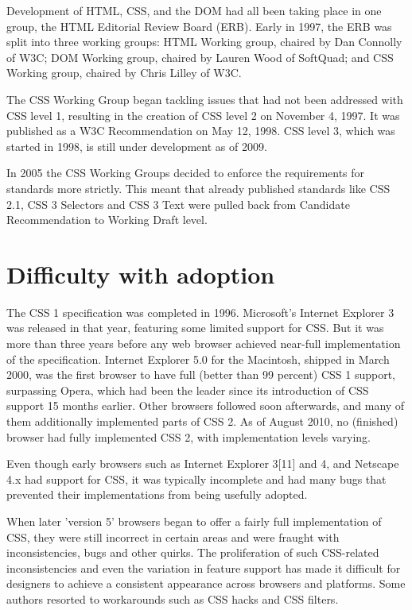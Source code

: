 Development of HTML, CSS, and the DOM had all been taking place in one group, the HTML Editorial Review Board (ERB). Early in 1997, the ERB was split into three working groups: HTML Working group, chaired by Dan Connolly of W3C; DOM Working group, chaired by Lauren Wood of SoftQuad; and CSS Working group, chaired by Chris Lilley of W3C.

The CSS Working Group began tackling issues that had not been addressed with CSS level 1, resulting in the creation of CSS level 2 on November 4, 1997. It was published as a W3C Recommendation on May 12, 1998. CSS level 3, which was started in 1998, is still under development as of 2009.

In 2005 the CSS Working Groups decided to enforce the requirements for standards more strictly. This meant that already published standards like CSS 2.1, CSS 3 Selectors and CSS 3 Text were pulled back from Candidate Recommendation to Working Draft level.




\section{Difficulty with adoption}


The CSS 1 specification was completed in 1996. Microsoft's Internet Explorer 3 was released in that year, featuring some limited support for CSS. But it was more than three years before any web browser achieved near-full implementation of the specification. Internet Explorer 5.0 for the Macintosh, shipped in March 2000, was the first browser to have full (better than 99 percent) CSS 1 support, surpassing Opera, which had been the leader since its introduction of CSS support 15 months earlier. Other browsers followed soon afterwards, and many of them additionally implemented parts of CSS 2. As of August 2010, no (finished) browser had fully implemented CSS 2, with implementation levels varying.


Even though early browsers such as Internet Explorer 3[11] and 4, and Netscape 4.x had support for CSS, it was typically incomplete and had many bugs that prevented their implementations from being usefully adopted.


When later 'version 5' browsers began to offer a fairly full implementation of CSS, they were still incorrect in certain areas and were fraught with inconsistencies, bugs and other quirks. The proliferation of such CSS-related inconsistencies and even the variation in feature support has made it difficult for designers to achieve a consistent appearance across browsers and platforms. Some authors resorted to workarounds such as CSS hacks and CSS filters.

